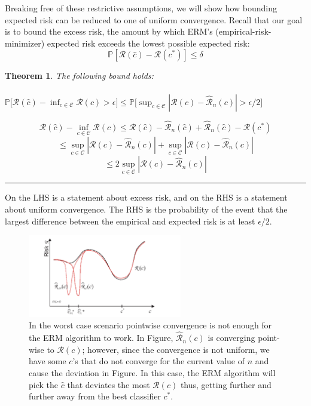 \documentclass[twoside]{article}
\newcounter{lecnum}
\newtheorem{theorem}{Theorem}[lecnum]
\newenvironment{proof}{{\bf Proof:}}{\hfill\rule{2mm}{2mm}}
\begin{document}
Breaking free of these restrictive assumptions, we will show how bounding expected
risk can be reduced to one of uniform convergence. Recall that our goal is to bound
the excess risk, the amount by which ERM’s (empirical-risk-minimizer) expected risk exceeds the lowest possible
expected risk:
$$\mathbb{P}[\mathcal{R}(\hat{c})- \mathcal{R}(c^*)] \leq \delta$$

\begin{theorem} The following bound holds:\\ \\
$\mathbb{P}\Big[\mathcal{R}(\hat{c}) - \inf_{c \in \mathcal{C}}{\mathcal{R}(c)} > \epsilon \Big] \leq \mathbb{P}\Big[ \sup_{c \in  \mathcal{C}}{|\mathcal{R}(c)- \mathcal{\hat{R}}_{n}(c) | > \epsilon/2} \Big]$
\end{theorem}

\begin{proof}
$$\mathcal{R}(\hat{c})- \inf_{c \in \mathcal{C}}{\mathcal{R}(c)} \leq \mathcal{R}(\hat{c})- \mathcal{\hat{R}}_{n}(\hat{c})+
\mathcal{\hat{R}}_{n}(\hat{c}) - \mathcal{R}(c^*)$$
$$\leq \sup_{c \in  \mathcal{C}}{|\mathcal{R}(c)- \mathcal{\hat{R}}_{n}(c)|} + \sup_{c \in  \mathcal{C}}{|\mathcal{R}(c)- \mathcal{\hat{R}}_{n}(c) |}$$
$$\leq 2\sup_{c \in  \mathcal{C}}{|\mathcal{R}(c)- \mathcal{\hat{R}}_{n}(c)|}$$
\end{proof}

On the LHS is a statement about excess risk, and on the RHS is a statement about
uniform convergence. The RHS is the probability of the event that the largest difference
between the empirical and expected risk is at least $\epsilon/2$.
\begin{figure}[h]
\centering
\includegraphics[width=0.6\textwidth]{img/erm.png}
\caption{In the worst case scenario pointwise convergence is not enough for the ERM algorithm to work. In Figure, $\mathcal{\hat{R}}_{n}(c)$ is  converging point-wise to $\mathcal{R}(c)$; however, since the convergence is not uniform, we have some $c$'s that do not converge for the current value of $n$ and cause the deviation in Figure. In this case, the ERM algorithm will pick the $\hat{c}$ that deviates the most $\mathcal{R}(c)$  thus, getting further and further away from the best classifier $c^*$.}
\end{figure}
\end{document}
